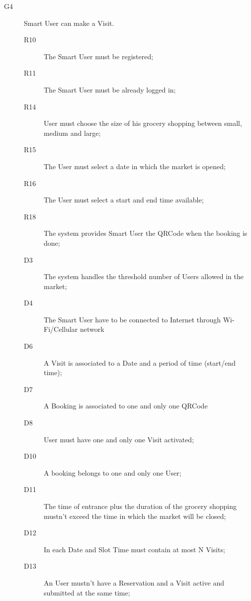 \begin{description}
    \item[G4]Smart User can make a Visit.
    \begin{description}
    \item[R10] The Smart User must be registered;
    \item[R11] The Smart User must be already logged in;
    \item[R14] User must choose the size of his grocery shopping between small, medium and large;
    \item[R15] The User must select a date in which the market is opened;
    \item[R16] The User must select a start and end time available;
    \item[R18] The system provides Smart User the QRCode when the booking is done;
    \item[D3] The system handles the threshold number of Users allowed in the market;
    \item[D4] The Smart User have to be connected to Internet through Wi-Fi/Cellular network
    \item[D6] A Visit is associated to a Date and a period of time (start/end time);
    \item[D7] A Booking is associated to one and only one QRCode
    \item[D8] User must have one and only one Visit activated;
    \item[D10] A booking belongs to one and only one User;
    \item[D11] The time of entrance plus the duration of the grocery shopping mustn’t exceed the time in which the market will be closed; 
    \item[D12] In each Date and Slot Time must contain at most N Visits;
    \item[D13] An User mustn’t have a Reservation and a Visit active and submitted at the same time; 
    \end{description}
    

\end{description}
